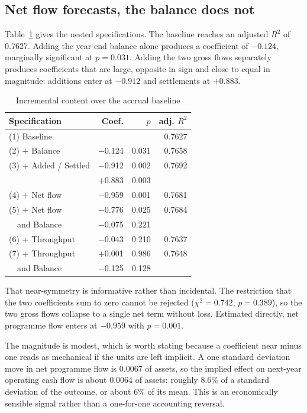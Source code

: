 \documentclass[conference,a4paper]{IEEEtran}
\begin{document}
\subsection{Net flow forecasts, the balance does not}

Table~\ref{tab:main} gives the nested specifications. The baseline reaches an
adjusted $R^2$ of 0.7627. Adding the year-end balance alone produces a
coefficient of $-0.124$, marginally significant at $p = 0.031$. Adding the two
gross flows separately produces coefficients that are large, opposite in sign and
close to equal in magnitude: additions enter at $-0.912$ and settlements at
$+0.883$.

\begin{table}[htbp]
\caption{Incremental content over the accrual baseline}
\label{tab:main}
\centering
\begin{tabular}{lrrr}
\hline
\textbf{Specification} & \textbf{Coef.} & \textbf{$p$} & \textbf{adj. $R^2$}\\
\hline
(1) Baseline & & & 0.7627\\
(2) $+$ Balance & $-$0.124 & 0.031 & 0.7658\\
(3) $+$ Added / Settled & $-$0.912 & 0.002 & 0.7692\\
 & $+$0.883 & 0.003 & \\
(4) $+$ Net flow & $-$0.959 & 0.001 & 0.7681\\
(5) $+$ Net flow & $-$0.776 & 0.025 & 0.7684\\
\quad\ \ and Balance & $-$0.075 & 0.221 & \\
(6) $+$ Throughput & $-$0.043 & 0.210 & 0.7637\\
(7) $+$ Throughput & $+$0.001 & 0.986 & 0.7648\\
\quad\ \ and Balance & $-$0.125 & 0.128 & \\
\hline
\end{tabular}
\end{table}

That near-symmetry is informative rather than incidental. The restriction that
the two coefficients sum to zero cannot be rejected ($\chi^2 = 0.742$,
$p = 0.389$), so the two gross flows collapse to a single net term without loss.
Estimated directly, net programme flow enters at $-0.959$ with $p = 0.001$.

The magnitude is modest, which is worth stating because a coefficient near minus
one reads as mechanical if the units are left implicit. A one standard deviation
move in net programme flow is 0.0067 of assets, so the implied effect on
next-year operating cash flow is about 0.0064 of assets: roughly 8.6\% of a
standard deviation of the outcome, or about 6\% of its mean. This is an
economically sensible signal rather than a one-for-one accounting reversal.
\end{document}
